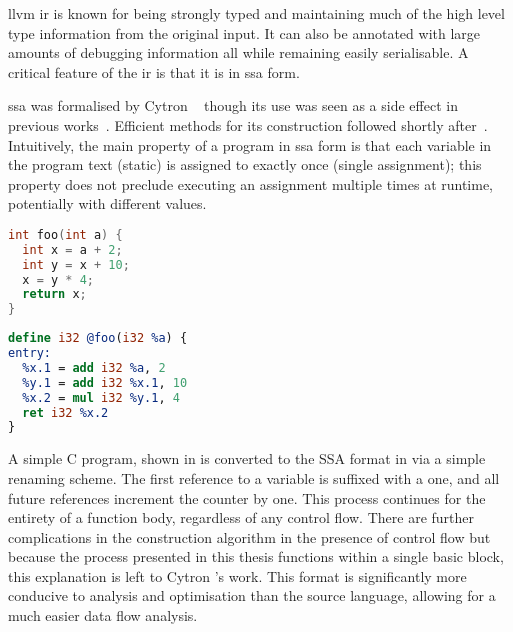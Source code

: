 \documentclass[\main/thesis.tex]{subfiles}
\begin{document}
\Gls{llvm} \gls{ir} is known for being strongly typed and maintaining much of the high level type information from the original input.
It can also be annotated with large amounts of debugging information all while remaining easily serialisable.
A critical feature of the \gls{ir} is that it is in \gls{ssa} form.

\Gls{ssa} was formalised by Cytron \etal~\autocite{cytron1989efficient} though its use was seen as a side effect in previous works~\autocite{rosen1988global,alpern1988detecting}.
Efficient methods for its construction followed shortly after~\autocite{cytron1991efficiently,brandis1994single}.
Intuitively, the main property of a program in \gls{ssa} form is that each variable in the program text (static) is assigned to exactly once (single assignment); this property does not preclude executing an assignment multiple times at runtime, potentially with different values.

\noindent
\begin{minipage}[t]{0.45\linewidth}
\centering
\begin{lstlisting}[caption={[Example C program, pre-SSA conversion.]An simple example C program, pre-conversion to \gls{ssa}.},
      label=lst:cSSA,numbers=none,language=c,columns=flexible]
int foo(int a) {
  int x = a + 2;
  int y = x + 10;
  x = y * 4;
  return x;
}
\end{lstlisting}
\end{minipage}
\hspace{.025\linewidth}
\noindent
\begin{minipage}[t]{0.45\linewidth}
\centering
\begin{lstlisting}[caption={[Example LLVM IR program, post-SSA conversion.]The same simple program, converted to \gls{llvm} \gls{ir} in \gls{ssa} format.},
      label=lst:llSSA,numbers=none,language=llvm,columns=flexible]
define i32 @foo(i32 %a) {
entry:
  %x.1 = add i32 %a, 2
  %y.1 = add i32 %x.1, 10
  %x.2 = mul i32 %y.1, 4
  ret i32 %x.2
}
\end{lstlisting}
\end{minipage}

A simple C program, shown in  is converted to the SSA format in  via a simple renaming scheme.
The first reference to a variable is suffixed with a one, and all future references increment the counter by one.
This process continues for the entirety of a function body, regardless of any control flow.
There are further complications in the construction algorithm in the presence of control flow but because the process presented in this thesis functions within a single \gls{basic block}, this explanation is left to Cytron \etal's work.
This format is significantly more conducive to analysis and optimisation than the source language, allowing for a much easier data flow analysis.
\end{document}
